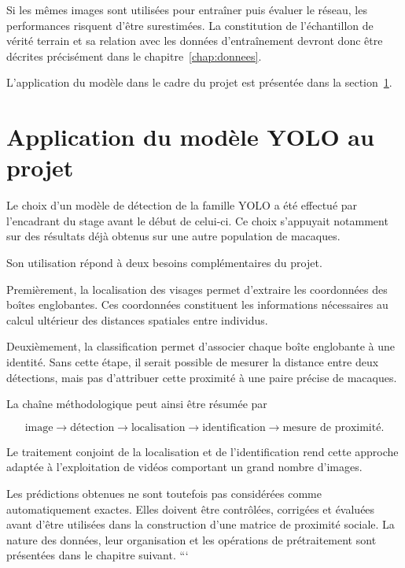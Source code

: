 \documentclass[11pt,a4paper]{report}
\begin{document}
Si les mêmes images sont utilisées pour entraîner puis évaluer le réseau, les
performances risquent d'être surestimées. La constitution de l'échantillon de
vérité terrain et sa relation avec les données d'entraînement devront donc être
décrites précisément dans le chapitre~\ref{chap:donnees}.

L'application du modèle dans le cadre du projet est présentée dans
 la section~\ref{sec:eval-application}.

\section{Application du modèle YOLO au projet}
\label{sec:eval-application}

Le choix d'un modèle de détection de la famille YOLO a été effectué par
l'encadrant du stage avant le début de celui-ci. Ce choix s'appuyait notamment
sur des résultats déjà obtenus sur une autre population de macaques.

Son utilisation répond à deux besoins complémentaires du projet.

Premièrement, la localisation des visages permet d'extraire les coordonnées des
boîtes englobantes. Ces coordonnées constituent les informations nécessaires
au calcul ultérieur des distances spatiales entre individus.

Deuxièmement, la classification permet d'associer chaque boîte englobante à une
identité. Sans cette étape, il serait possible de mesurer la distance entre
deux détections, mais pas d'attribuer cette proximité à une paire précise de
macaques.

La chaîne méthodologique peut ainsi être résumée par

\begin{equation}
    \text{image}
    \longrightarrow
    \text{détection}
    \longrightarrow
    \text{localisation}
    \longrightarrow
    \text{identification}
    \longrightarrow
    \text{mesure de proximité}.
\end{equation}

Le traitement conjoint de la localisation et de l'identification rend cette
approche adaptée à l'exploitation de vidéos comportant un grand nombre
d'images.

Les prédictions obtenues ne sont toutefois pas considérées comme
automatiquement exactes. Elles doivent être contrôlées, corrigées et évaluées
avant d'être utilisées dans la construction d'une matrice de proximité sociale.
La nature des données, leur organisation et les opérations de prétraitement
sont présentées dans le chapitre suivant.
```
\end{document}

